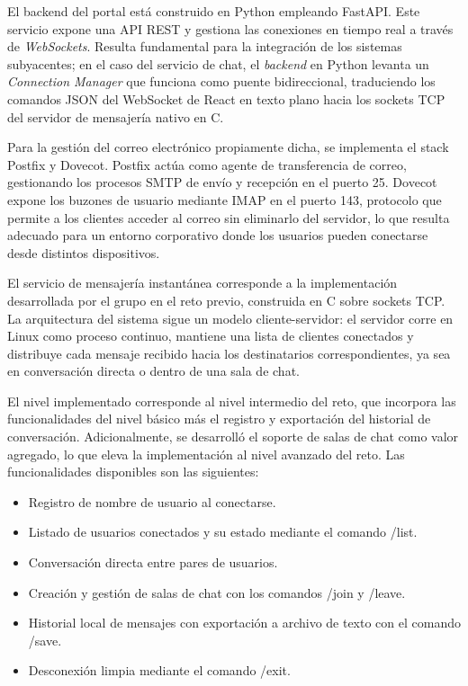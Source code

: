 El backend del portal está construido en Python empleando FastAPI. Este servicio expone una API REST y gestiona las conexiones en tiempo real a través de \textit{WebSockets}. Resulta fundamental para la integración de los sistemas subyacentes; en el caso del servicio de chat, el \textit{backend} en Python levanta un \textit{Connection Manager} que funciona como puente bidireccional, traduciendo los comandos JSON del WebSocket de React en texto plano hacia los sockets TCP del servidor de mensajería nativo en C.

Para la gestión del correo electrónico propiamente dicha, se implementa el stack Postfix y Dovecot. Postfix
actúa como agente de transferencia de correo, gestionando los procesos SMTP
de envío y recepción en el puerto 25. Dovecot expone los buzones de usuario
mediante IMAP en el puerto 143, protocolo que permite a los clientes acceder
al correo sin eliminarlo del servidor, lo que resulta adecuado para un entorno
corporativo donde los usuarios pueden conectarse desde distintos dispositivos.

El servicio de mensajería instantánea corresponde a la implementación
desarrollada por el grupo en el reto previo, construida en C sobre sockets
TCP. La arquitectura del sistema sigue un modelo cliente-servidor: el servidor
corre en Linux como proceso continuo, mantiene una lista de clientes
conectados y distribuye cada mensaje recibido hacia los destinatarios
correspondientes, ya sea en conversación directa o dentro de una sala de chat.

El nivel implementado corresponde al nivel intermedio del reto, que incorpora
las funcionalidades del nivel básico más el registro y exportación del
historial de conversación. Adicionalmente, se desarrolló el soporte de salas
de chat como valor agregado, lo que eleva la implementación al nivel avanzado
del reto. Las funcionalidades disponibles son las siguientes:

\begin{itemize}
    \item Registro de nombre de usuario al conectarse.
    \item Listado de usuarios conectados y su estado mediante el comando /list.
    \item Conversación directa entre pares de usuarios.
    \item Creación y gestión de salas de chat con los comandos /join y /leave.
    \item Historial local de mensajes con exportación a archivo de texto con el comando /save.
    \item Desconexión limpia mediante el comando /exit.
\end{itemize}

